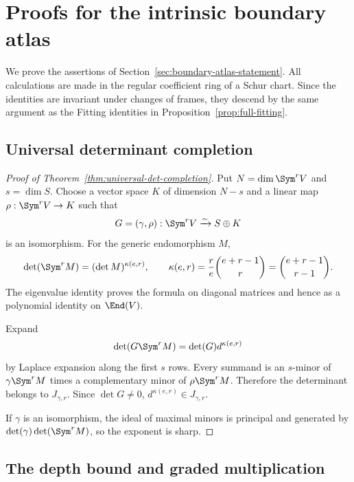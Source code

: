 \section{Proofs for the intrinsic boundary atlas}
\label{sec:boundary-atlas-proofs}

We prove the assertions of
Section~\ref{sec:boundary-atlas-statement}.  All calculations are made
in the regular coefficient ring of a Schur chart.  Since the
identities are invariant under changes of frames, they descend by the
same argument as the Fitting identities in
Proposition~\ref{prop:full-fitting}.

\subsection{Universal determinant completion}

\begin{proof}[Proof of Theorem~\ref{thm:universal-det-completion}]
Put \(N=\dim\Sym^rV\) and \(s=\dim S\).  Choose a vector
space \(K\) of dimension \(N-s\) and a linear map
\(\rho:\Sym^rV\to K\) such that
\[
 G=(\gamma,\rho):\Sym^rV\xrightarrow{\sim}S\oplus K
\]
is an isomorphism.  For the generic endomorphism \(M\),
\[
 \det(\Sym^rM)=(\det M)^{\kappa(e,r)},\qquad
 \kappa(e,r)=\frac r e\binom{e+r-1}{r}
              =\binom{e+r-1}{r-1}.
\]
The eigenvalue identity proves the formula on diagonal matrices and
hence as a polynomial identity on \(\End(V)\).

Expand
\[
 \det(G\Sym^rM)=\det(G)d^{\kappa(e,r)}
\]
by Laplace expansion along the first \(s\) rows.  Every summand is
an \(s\)-minor of \(\gamma\Sym^rM\) times a complementary
minor of \(\rho\Sym^rM\).  Therefore the determinant belongs to
\(J_{\gamma,r}\).  Since \(\det G\ne0\),
\(d^{\kappa(e,r)}\in J_{\gamma,r}\).

If \(\gamma\) is an isomorphism, the ideal of maximal minors is
principal and generated by
\(\det(\gamma)\det(\Sym^rM)\), so the exponent is sharp.
\end{proof}

\subsection{The depth bound and graded multiplication}

